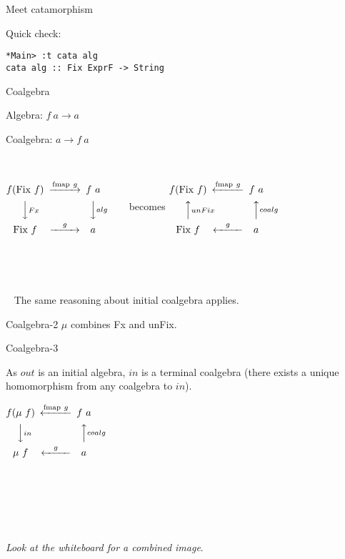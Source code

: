 \documentclass{beamer}
\newcommand{\hin}[2]{}
\begin{document}
\begin{frame}[fragile]{Meet catamorphism}

\hin{110}{110}


\hin{115}{116}

Quick check:

\hin{43}{46}

\begin{verbatim}
*Main> :t cata alg
cata alg :: Fix ExprF -> String
\end{verbatim}
\end{frame}


\begin{frame}[fragile]{Coalgebra}

Algebra: $f\ a \rightarrow a$

Coalgebra: $a \rightarrow f\ a$

~

$
\begin{CD}
f (\text{Fix} \ f) @>\text{fmap} \ g>> f\ a\\
@VVFxV @VValgV\\
\text{Fix} \ f @>g>> a
\end{CD}
$
~~~~~becomes 
$
\begin{CD}
f (\text{Fix} \ f) @<\text{fmap} \ g<< f\ a\\
@AAunFixA @AAcoalgA\\
\text{Fix} \ f @<g<< a
\end{CD}
$

~

~

~
The same reasoning about initial coalgebra applies.


\end{frame}


\begin{frame}{Coalgebra-2}
$\mu$ combines Fx and unFix. 

\hin{141}{141}

\hin{142}{142}
\hin{55}{55}
\hin{145}{149}
\end{frame}

\begin{frame}{Coalgebra-3}

As $out$ is an initial algebra, $in$ is a terminal coalgebra (there exists a unique homomorphism from any coalgebra to $in$).
\begin{center}

$
\begin{CD}
f (\mu \ f) @<\text{fmap} \ g<< f\ a\\
@VVinV @AAcoalgA\\
\mu \ f @<g<< a
\end{CD}
$

~

~

~
\end{center}

\textit{Look at the whiteboard for a combined image}.


\end{frame}
\end{document}
